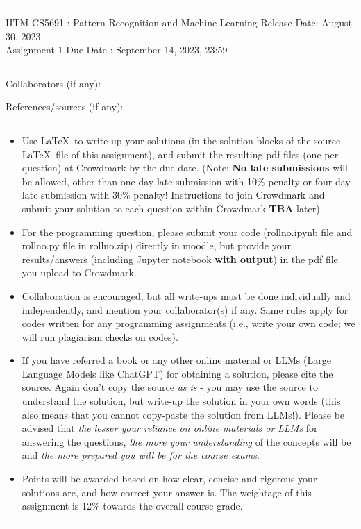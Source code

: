 \documentclass[solution,addpoints,12pt]{exam}
\begin{document}
\hrule
\vspace{3mm}
\noindent 
{\sf IITM-CS5691 : Pattern Recognition and Machine Learning  \hfill Release Date: August 30, 2023}
\\
\noindent 
{\sf Assignment 1 \hfill Due Date : September 14, 2023, 23:59}
\vspace{3mm}
\hrule
\vspace{3mm}

\noindent
{{\sf Collaborators (if any): }} %

\noindent
{{\sf References/sources (if any): 
}} %


\vspace{3mm}
\hrule
{\small
\begin{itemize}
\item Use \LaTeX\ to write-up your solutions (in the solution blocks of the source \LaTeX\ file of this assignment), and submit the resulting pdf files (one per question) at Crowdmark by the due date. (Note: {\bf No late submissions} will be allowed, other than one-day late submission with 10\% penalty or four-day late submission with 30\% penalty! Instructions to join Crowdmark and submit your solution to each question within Crowdmark \textbf{TBA} later).
\item For the programming question, please submit your code (rollno.ipynb file and rollno.py file in rollno.zip) directly in moodle, but provide your results/answers (including Jupyter notebook {\bf with output}) in the pdf file you upload to Crowdmark.
\item Collaboration is encouraged, but all write-ups must be done individually and independently, and mention your collaborator(s) if any. Same rules apply for codes written for any programming assignments (i.e., write your own code; we will run plagiarism checks on codes).
\item  If you have referred a book or any other online material or LLMs (Large Language Models like ChatGPT) for obtaining a solution, please cite the source. Again don't copy the source {\it as is} - you may use the source to understand the solution, but write-up the solution in your own words (this also means that you cannot copy-paste the solution from LLMs!). Please be advised that {\it the lesser your reliance on online materials or LLMs} for answering the questions, {\it the more your understanding} of the concepts will be and {\it the more prepared you will be for the course exams}.  
\item Points will be awarded based on how clear, concise and rigorous your solutions are, and how correct your answer is. The weightage of this assignment is 12\% towards the overall course grade. 
\end{itemize}
}
\hrule
\end{document}
